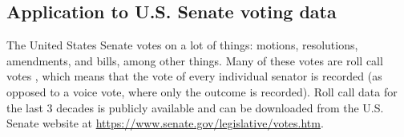 \documentclass{ximera}
\begin{document}
\subsection*{Application to U.S. Senate voting data}

The United States Senate%
%
%
 votes on a lot of things: motions,
resolutions, amendments, and bills, among other things. Many of these
votes are roll call votes%
%
, which means that the vote of every individual
senator is recorded (as opposed to a voice vote, where only the
outcome is recorded). Roll call data for the last 3 decades is
publicly available and can be downloaded from the U.S. Senate website
at \url{https://www.senate.gov/legislative/votes.htm}.
\end{document}
